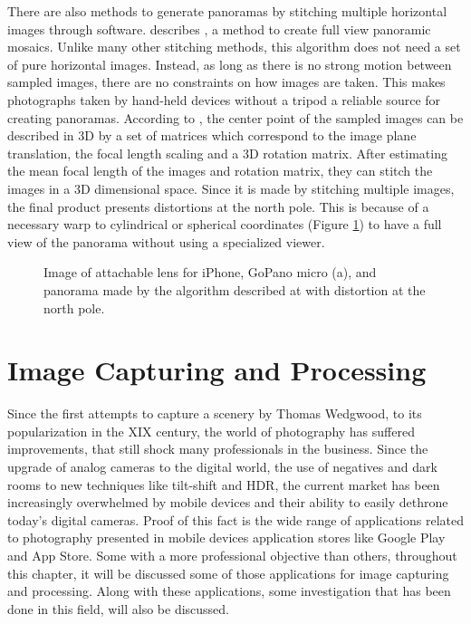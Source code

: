There are also methods to generate panoramas by stitching multiple horizontal images through software. \citeauthor{Szeliski} describes \cite{Szeliski}, a method to create full view panoramic mosaics. 
Unlike many other stitching methods, this algorithm does not need a set of pure horizontal images. Instead, as long as there is no strong motion between sampled images, there are no constraints on how images are taken. This makes photographs taken by hand-held devices without a tripod a reliable source for creating panoramas. According to \citeauthor{Szeliski}, the center point of the sampled images can be described in 3D by a set of matrices which correspond to the image plane translation, the focal length scaling and a 3D rotation matrix. After estimating the mean focal length of the images and rotation matrix, they can stitch the images in a 3D dimensional space.
Since it is made by stitching multiple images, the final product presents distortions at the north pole. This is because of a necessary warp to cylindrical or spherical coordinates (Figure \ref{fig:panoramic_image}) to have a full view of the panorama without using a specialized viewer.

\begin{figure}[htbp]
        \centering
  \caption{Image of attachable lens for iPhone, GoPano micro (a), and panorama made by the algorithm described at \cite{Szeliski} with distortion at the north pole.}
  \label{fig:panoramic_image}
\end{figure}



\section{Image Capturing and Processing}
\label{sub:capturing_processing}

Since the first attempts to capture a scenery by Thomas Wedgwood, to its popularization in the XIX century, the world of photography has suffered improvements, that still shock many professionals in the business. Since the upgrade of analog cameras to the digital world, the use of negatives and dark rooms to new techniques like tilt-shift and HDR, the current market has been increasingly overwhelmed by mobile devices and their ability to easily dethrone today’s digital cameras. Proof of this fact is the wide range of applications related to photography presented in mobile devices application stores like Google Play and App Store. Some with a more professional objective than others, throughout this chapter, it will be discussed some of those applications for image capturing and processing. Along with these applications, some investigation that has been done in this field, will also be discussed.

